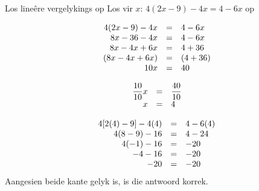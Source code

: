 \begin{wex}
{Los line\^ere vergelykings op }
{Los vir $x$: $4(2x-9)-4x=4-6x$ op}
{

\begin{equation*}
    \begin{array}{ccl}\hfill 4(2x-9)-4x& =& 4-6x\hfill  \\ 
	\hfill 8x-36-4x& =& 4-6x\hfill   \\ 
	\hfill 8x-4x+6x& =& 4+36\hfill  \\ 
	\hfill (8x-4x+6x)& =& (4+36)\hfill   \\   
	\hfill 10x& =& 40\hfill  
    \end{array}
\end{equation*}

\begin{equation*}
    \begin{array}{ccl}
	\hfill \dfrac{10}{10}x& =& \dfrac{40}{10}\hfill\\
	\hfill x& =& 4\hfill  
    \end{array}
\end{equation*}


\begin{equation*}
    \begin{array}{ccl}\hfill 4[2(4)-9]-4(4)& =& 4-6(4)\hfill \\
	\hfill 4(8-9)-16& =& 4-24\hfill \\
	\hfill 4(-1)-16& =& -20\hfill \\
	\hfill -4-16& =& -20\hfill \\
	\hfill -20& =& -20\hfill 
    \end{array}
\end{equation*}
Aangesien beide kante gelyk is, is die antwoord korrek.
}
\end{wex}


